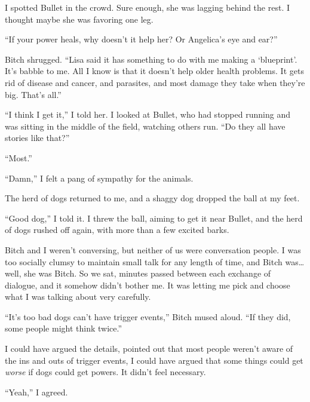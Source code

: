 I spotted Bullet in the crowd.  Sure enough, she was lagging behind the rest.  I thought maybe she was favoring one leg.



``If your power heals, why doesn't it help her?  Or Angelica's eye and ear?''



Bitch shrugged.  ``Lisa said it has something to do with me making a `blueprint'.  It's babble to me.  All I know is that it doesn't help older health problems.  It gets rid of disease and cancer, and parasites, and most damage they take when they're big.  That's all.''



``I think I get it,'' I told her.  I looked at Bullet, who had stopped running and was sitting in the middle of the field, watching others run.  ``Do they all have stories like that?''



``Most.''



``Damn,'' I felt a pang of sympathy for the animals.



The herd of dogs returned to me, and a shaggy dog dropped the ball at my feet.



``Good dog,'' I told it.  I threw the ball, aiming to get it near Bullet, and the herd of dogs rushed off again, with more than a few excited barks.



Bitch and I weren't conversing, but neither of us were conversation people.  I was too socially clumsy to maintain small talk for any length of time, and Bitch was\ldots well, she was Bitch.  So we sat, minutes passed between each exchange of dialogue, and it somehow didn't bother me.  It was letting me pick and choose what I was talking about very carefully.



``It's too bad dogs can't have trigger events,'' Bitch mused aloud.  ``If they did, some people might think twice.''



I could have argued the details, pointed out that most people weren't aware of the ins and outs of trigger events, I could have argued that some things could get \emph{worse} if dogs could get powers.  It didn't feel necessary.



``Yeah,'' I agreed.



